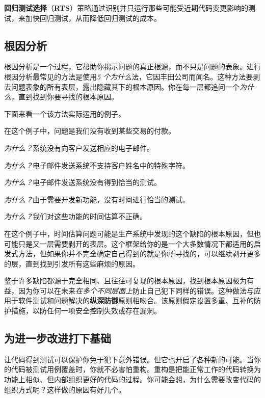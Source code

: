 \label{idx:799}
\textbf{回归测试选择}（\textbf{RTS}）策略通过识别并只运行那些可能受近期代码变更影响的测试，来加快回归测试，从而降低回归测试的成本。

\subsection{根因分析}

\label{idx:800}
\label{idx:801}
根因分析是一个过程，它帮助你揭示问题的真正根源，而不只是问题的表象。进行根因分析最常见的方法是使用\emph{5 个为什么}法，它因丰田公司而闻名。这种方法要剥去问题表象的所有表层，露出隐藏其下的根本原因。你在每一层都追问一个\emph{为什么}，直到找到你要寻找的根本原因。

下面来看一个该方法实际运用的例子。

在这个例子中，问题是我们没有收到某些交易的付款。

\emph{为什么？}系统没有向客户发送相应的电子邮件。

\emph{为什么？}电子邮件发送系统不支持客户姓名中的特殊字符。

\emph{为什么？}电子邮件发送系统没有得到恰当的测试。

\emph{为什么？}由于需要开发新功能，没有时间进行恰当的测试。

\emph{为什么？}我们对这些功能的时间估算不正确。

在这个例子中，时间估算问题可能是生产系统中发现的这个缺陷的根本原因，但也可能只是又一层需要剥开的表层。这个框架给你的是一个大多数情况下都适用的启发式方法，但如果你并不完全确定自己得到的就是你所寻找的，可以继续剥开更多的层，直到找到引发所有这些麻烦的原因。

\label{idx:802}
\label{idx:803}
\label{idx:804}
鉴于许多缺陷都源于完全相同、且往往可复现的根本原因，找到根本原因极为有益，因为你可以在未来\emph{在多个不同层面上}防止自己犯下同样的错误。这种做法与应用于软件测试和问题解决的\textbf{纵}\textbf{深}\textbf{防御}原则相吻合。该原则假定设置多重、互补的防护措施，以防任何一项安全控制失效或存在漏洞。

\subsection{为进一步改进打下基础}

\label{idx:805}
让代码得到测试可以保护你免于犯下意外错误。但它也开启了各种新的可能。当你的代码被测试用例覆盖时，你就不必害怕重构。重构是把能正常工作的代码转换为功能上相似、但内部组织更好的代码的过程。你可能会想，为什么需要改变代码的组织方式呢？这样做的原因有好几个。

